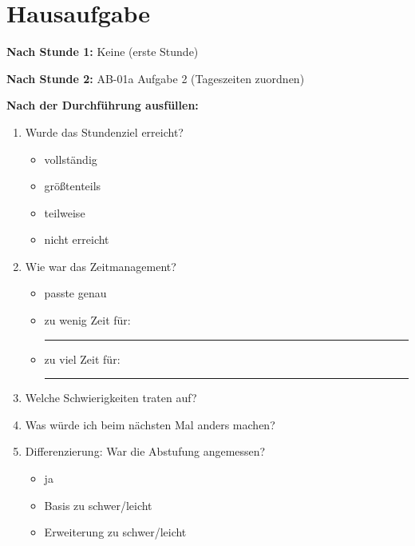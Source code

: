\documentclass[11pt,a4paper]{article}
\begin{document}
\vspace{1em}

\section*{Hausaufgabe}

\textbf{Nach Stunde 1:} Keine (erste Stunde)

\textbf{Nach Stunde 2:} AB-01a Aufgabe 2 (Tageszeiten zuordnen)

\vspace{1em}

\begin{reflexbox}

\textbf{Nach der Durchführung ausfüllen:}

\begin{enumerate}
    \item Wurde das Stundenziel erreicht?
    \begin{itemize}[nosep]
        \item[$\square$] vollständig
        \item[$\square$] größtenteils
        \item[$\square$] teilweise
        \item[$\square$] nicht erreicht
    \end{itemize}

    \item Wie war das Zeitmanagement?
    \begin{itemize}[nosep]
        \item[$\square$] passte genau
        \item[$\square$] zu wenig Zeit für: \rule{5cm}{0.4pt}
        \item[$\square$] zu viel Zeit für: \rule{5cm}{0.4pt}
    \end{itemize}

    \item Welche Schwierigkeiten traten auf?\\[2em]

    \item Was würde ich beim nächsten Mal anders machen?\\[2em]

    \item Differenzierung: War die Abstufung angemessen?
    \begin{itemize}[nosep]
        \item[$\square$] ja
        \item[$\square$] Basis zu schwer/leicht
        \item[$\square$] Erweiterung zu schwer/leicht
    \end{itemize}
\end{enumerate}

\end{reflexbox}
\end{document}
